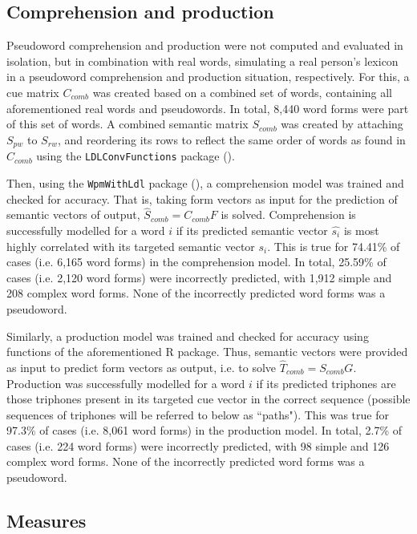 \subsection{Comprehension and production}\label{section05_1_5}

Pseudoword comprehension and production were not computed and evaluated in isolation, but in combination with real words, simulating a real person’s lexicon in a pseudoword comprehension and production situation, respectively. For this, a cue matrix $C_{comb}$ was created based on a combined set of words, containing all aforementioned real words and pseudowords. In total, 8,440 word forms were part of this set of words. A combined semantic matrix $S_{comb}$ was created by attaching $S_{pw}$ to $S_{rw}$, and reordering its rows to reflect the same order of words as found in $C_{comb}$ using the \texttt{LDLConvFunctions} package (\cite{Schmitz2021ldlconv}).

Then, using the \texttt{WpmWithLdl} package (\cite{Baayen2019wpm}), a comprehension model was trained and checked for accuracy. That is, taking form vectors as input for the prediction of semantic vectors of output, $\hat{S}_{comb}=C_{comb}F$ is solved. Comprehension is successfully modelled for a word $i$ if its predicted semantic vector $\hat{s_i}$ is most highly correlated with its targeted semantic vector $s_i$. This is true for 74.41\% of cases (i.e. 6,165 word forms) in the comprehension model. In total, 25.59\% of cases (i.e. 2,120 word forms) were incorrectly predicted, with 1,912 simple and 208 complex word forms. None of the incorrectly predicted word forms was a pseudoword.

Similarly, a production model was trained and checked for accuracy using functions of the aforementioned R package. Thus, semantic vectors were provided as input to predict form vectors as output, i.e. to solve $\hat{T}_{comb}=S_{comb}G$. Production was successfully modelled for a word $i$ if its predicted triphones are those triphones present in its targeted cue vector in the correct sequence (possible sequences of triphones will be referred to below as ``paths"). This was true for 97.3\% of cases (i.e. 8,061 word forms) in the production model. In total, 2.7\% of cases (i.e. 224 word forms) were incorrectly predicted, with 98 simple and 126 complex word forms. None of the incorrectly predicted word forms was a pseudoword.

\subsection{Measures}\label{section05_1_6}


